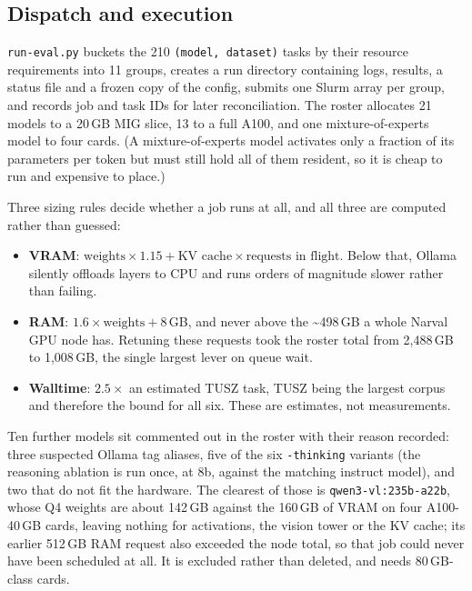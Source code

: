 \documentclass[11pt,a4paper]{article}
\newcommand{\file}[1]{{\small\texttt{#1}}}
\begin{document}
\subsection{Dispatch and execution}

\file{run-eval.py} buckets the 210 \texttt{(model, dataset)} tasks by their
resource requirements into 11 groups, creates a run directory containing logs,
results, a status file and a frozen copy of the config, submits one Slurm array
per group, and records job and task IDs for later reconciliation. The roster
allocates 21 models to a 20\,GB MIG slice, 13 to a full A100, and one
mixture-of-experts model to four cards. (A mixture-of-experts model activates only
a fraction of its parameters per token but must still hold all of them resident,
so it is cheap to run and expensive to place.)

Three sizing rules decide whether a job runs at all, and all three are computed
rather than guessed:

\begin{itemize}
\item \textbf{VRAM}: $\text{weights} \times 1.15 + \text{KV cache} \times
      \text{requests in flight}$. Below that, Ollama silently offloads layers to
      CPU and runs orders of magnitude slower rather than failing.
\item \textbf{RAM}: $1.6 \times \text{weights} + 8$\,GB, and never above the
      \textasciitilde498\,GB a whole Narval GPU node has. Retuning these requests
      took the roster total from 2{,}488\,GB to 1{,}008\,GB, the single largest
      lever on queue wait.
\item \textbf{Walltime}: $2.5\times$ an estimated TUSZ task, TUSZ being the
      largest corpus and therefore the bound for all six. These are estimates, not
      measurements.
\end{itemize}

Ten further models sit commented out in the roster with their reason recorded:
three suspected Ollama tag aliases, five of the six \texttt{-thinking} variants
(the reasoning ablation is run once, at 8b, against the matching instruct model),
and two that do not fit the hardware. The clearest of those is
\texttt{qwen3-vl:235b-a22b}, whose Q4 weights are about 142\,GB against the
160\,GB of VRAM on four A100-40\,GB cards, leaving nothing for activations, the
vision tower or the KV cache; its earlier 512\,GB RAM request also exceeded the
node total, so that job could never have been scheduled at all. It is excluded
rather than deleted, and needs 80\,GB-class cards.
\end{document}
